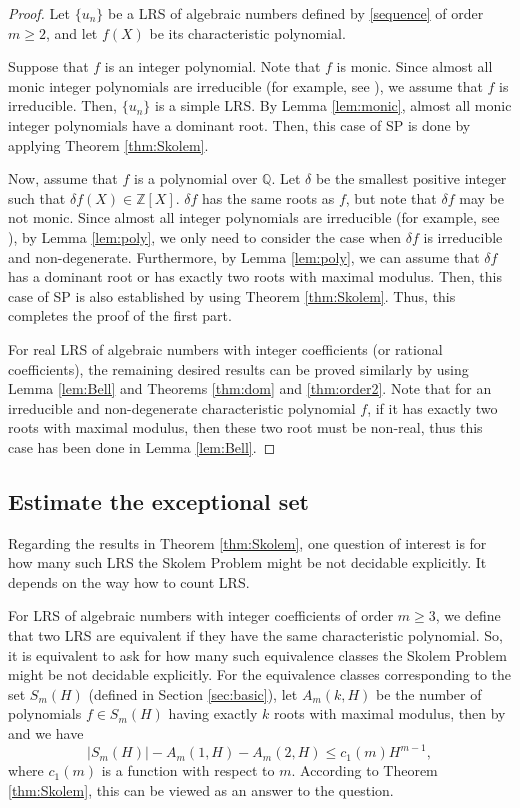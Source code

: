 \documentclass[12pt]{amsart}
\theoremstyle{definition}
\theoremstyle{remark}
\numberwithin{equation}{section}
\begin{document}
\begin{proof}
Let $\{u_n\}$ be a LRS of algebraic numbers defined by \eqref{sequence} of order $m\ge 2$, and let $f(X)$ be its characteristic polynomial. 

Suppose that $f$ is an integer polynomial. Note that $f$ is monic. Since almost all monic integer polynomials are irreducible (for example, see \cite{Chela}), we assume that $f$ is irreducible. Then, $\{u_n\}$ is a simple LRS.  By Lemma \ref{lem:monic}, almost all monic integer polynomials have a dominant root. Then, this case of SP is done by applying Theorem \ref{thm:Skolem}.

Now, assume that $f$ is a polynomial over ${{\mathbb Q}}$. Let $\delta$ be the smallest positive integer such that $\delta f(X)\in {{\mathbb Z}}[X]$. $\delta f$ has the same roots as $f$, but note that $\delta f$ may be not monic. Since almost all integer polynomials are irreducible (for example, see \cite{Kuba}), by Lemma \ref{lem:poly}, we only need to consider the case when $\delta f$ is irreducible and non-degenerate. Furthermore, by Lemma \ref{lem:poly}, we can assume that $\delta f$ has a dominant root or has exactly two roots with maximal modulus. Then, this case of SP is also established by using Theorem \ref{thm:Skolem}. Thus, this completes the proof of the first part. 

For real LRS of algebraic numbers with integer coefficients (or rational coefficients), the remaining desired results can be proved similarly by using Lemma \ref{lem:Bell} and Theorems \ref{thm:dom} and \ref{thm:order2}. Note that for an irreducible and  non-degenerate characteristic polynomial $f$, if it has exactly two roots with maximal modulus,  then these two root must be non-real, thus this case has been done in Lemma \ref{lem:Bell}.
\end{proof}

\subsection{Estimate the exceptional set}
\label{sec:except}

Regarding the results in Theorem \ref{thm:Skolem}, one question of interest is for how many such LRS the Skolem Problem might be not decidable explicitly. It depends on the way how to count LRS. 

For LRS of algebraic numbers with integer coefficients of order $m\ge 3$, we define that two LRS are equivalent if they have the same characteristic polynomial. So, it is equivalent to ask for how many such equivalence classes the Skolem Problem might be not decidable explicitly. 
For the equivalence classes corresponding to the set 
$S_m(H)$ (defined in Section \ref{sec:basic}), 
let $A_m(k,H)$ be the number of polynomials $f\in S_m(H)$ having exactly $k$ roots with maximal modulus, then by \cite[Theorem 3.2]{DS3} and \cite[Theorem 1.1]{DS1} we have 
\begin{equation}
\label{eq:except1}
|S_m(H)| - A_m(1,H) - A_m(2,H)\le c_1(m) H^{m-1}, 
\end{equation}
where $c_1(m)$ is a function with respect to $m$. 
According to Theorem \ref{thm:Skolem}, this can be viewed as an answer to the question. 
\end{document}
